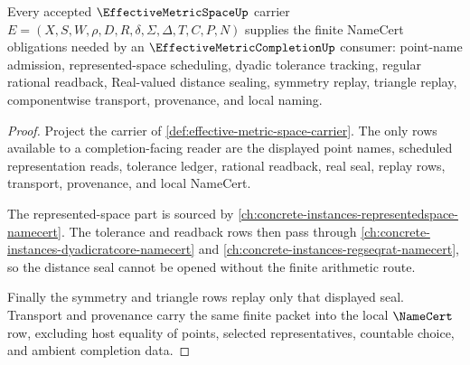 \begin{theorem}
\label{thm:effective-metric-space-namecert-obligations}
Every accepted $\EffectiveMetricSpaceUp$ carrier $E=(X,S,W,\rho,D,R,\delta,\Sigma,\Delta,T,C,P,N)$ supplies the finite NameCert obligations needed by an $\EffectiveMetricCompletionUp$ consumer: point-name admission, represented-space scheduling, dyadic tolerance tracking, regular rational readback, Real-valued distance sealing, symmetry replay, triangle replay, componentwise transport, provenance, and local naming.
\end{theorem}
\begin{proof}
Project the carrier of \autoref{def:effective-metric-space-carrier}. The only rows available to a completion-facing reader are the displayed point names, scheduled representation reads, tolerance ledger, rational readback, real seal, replay rows, transport, provenance, and local NameCert.

The represented-space part is sourced by \autoref{ch:concrete-instances-representedspace-namecert}. The tolerance and readback rows then pass through \autoref{ch:concrete-instances-dyadicratcore-namecert} and \autoref{ch:concrete-instances-regseqrat-namecert}, so the distance seal cannot be opened without the finite arithmetic route.

Finally the symmetry and triangle rows replay only that displayed seal. Transport and provenance carry the same finite packet into the local $\NameCert$ row, excluding host equality of points, selected representatives, countable choice, and ambient completion data.
\end{proof}

